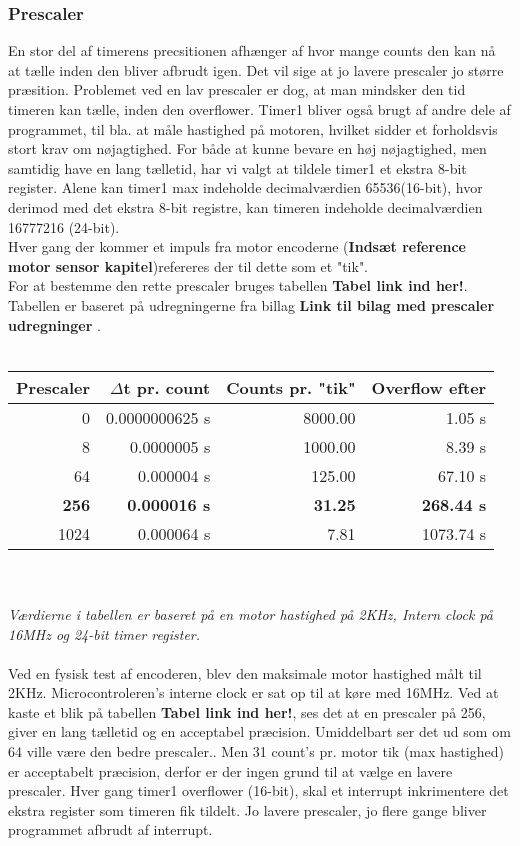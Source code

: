\subsubsection{Prescaler}
En stor del af timerens precsitionen afhænger af hvor mange counts den kan nå at tælle inden den bliver afbrudt igen. Det vil sige at jo lavere prescaler jo større præsition. Problemet ved en lav prescaler er dog, at man mindsker den tid timeren kan tælle, inden den overflower. Timer1 bliver også brugt af andre dele af programmet, til bla. at måle hastighed på motoren, hvilket sidder et forholdsvis stort krav om nøjagtighed. For både at kunne bevare en høj nøjagtighed, men samtidig have en lang tælletid, har vi valgt at tildele timer1 et ekstra 8-bit register. Alene kan timer1 max indeholde decimalværdien 65536(16-bit), hvor derimod med det ekstra 8-bit registre, kan timeren indeholde decimalværdien 16777216 (24-bit).\\
Hver gang der kommer et impuls fra motor encoderne (\textbf{Indsæt reference motor sensor kapitel})refereres der til dette som et "tik".\\
For at bestemme den rette prescaler bruges tabellen \textbf{Tabel link ind her!}. Tabellen er baseret på udregningerne fra billag \textbf{Link til bilag med prescaler udregninger} .\\
\\
\begin{tabular}{ | r | r | r | r | }
	\hline
	Prescaler 		& $\Delta$t pr. count 	& Counts pr. "tik"	&	Overflow efter		\\
	\hline
	0 				& 	 	0.0000000625 s	&  		8000.00		&		1.05 s			\\
	\hline	
	8 				& 	 	0.0000005 s		&  		1000.00		&		8.39 s			\\
	\hline
	64 				& 	 	0.000004 s		&  		125.00		&		67.10 s			\\
	\hline
	\textbf{256} 	& \textbf{0.000016 s}	&  	\textbf{31.25}	&	\textbf{268.44 s}	\\
	\hline
	1024 			& 	 	0.000064 s		&  		7.81		&		1073.74 s		\\
	\hline
\end{tabular}\\\\
\textsl{\footnotesize *Værdierne i tabellen er baseret på en motor hastighed på 2KHz, Intern clock på 16MHz og 24-bit timer register.}\\
\\
Ved en fysisk test af encoderen, blev den maksimale motor hastighed målt til 2KHz.
Microcontroleren's interne clock er sat op til at køre med 16MHz. Ved at kaste et blik på tabellen \textbf{Tabel link ind her!}, ses det at en prescaler på 256, giver en lang tælletid og en acceptabel præcision. Umiddelbart ser det ud som om 64 ville være den bedre prescaler.. 
Men 31 count's pr. motor tik (max hastighed) er acceptabelt præcision, derfor er der ingen grund til at vælge en lavere prescaler. Hver gang timer1 overflower (16-bit), skal et interrupt inkrimentere det ekstra register som timeren fik tildelt. Jo lavere prescaler, jo flere gange bliver programmet afbrudt af interrupt.




